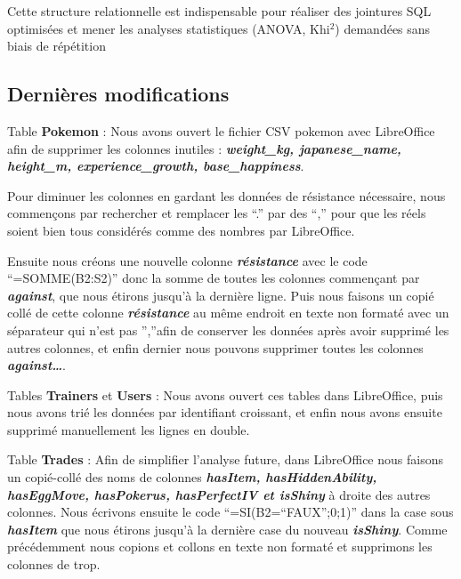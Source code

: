 \documentclass[mstat,12pt]{unswthesis}
\begin{document}
Cette structure relationnelle est indispensable pour réaliser des
jointures SQL optimisées et mener les analyses statistiques (ANOVA,
Khi\(^2\)) demandées sans biais de répétition

\bigskip

\subsection{Dernières modifications}\label{derniuxe8res-modifications}

Table \textbf{Pokemon} : Nous avons ouvert le fichier CSV pokemon avec
LibreOffice afin de supprimer les colonnes inutiles :
\textbf{\emph{weight\_kg, japanese\_name, height\_m, experience\_growth,
base\_happiness}}.

\bigskip

Pour diminuer les colonnes en gardant les données de résistance
nécessaire, nous commençons par rechercher et remplacer les ``.'' par
des ``,'' pour que les réels soient bien tous considérés comme des
nombres par LibreOffice.

\bigskip

Ensuite nous créons une nouvelle colonne \textbf{\emph{résistance}} avec
le code ``=SOMME(B2:S2)'' donc la somme de toutes les colonnes
commençant par \textbf{\emph{against}}, que nous étirons jusqu'à la
dernière ligne. Puis nous faisons un copié collé de cette colonne
\textbf{\emph{résistance}} au même endroit en texte non formaté avec un
séparateur qui n'est pas '',''afin de conserver les données après avoir
supprimé les autres colonnes, et enfin dernier nous pouvons supprimer
toutes les colonnes \textbf{\emph{against\ldots{}}}.

\bigskip

Tables \textbf{Trainers} et \textbf{Users} : Nous avons ouvert ces
tables dans LibreOffice, puis nous avons trié les données par
identifiant croissant, et enfin nous avons ensuite supprimé manuellement
les lignes en double.

\bigskip

Table \textbf{Trades} : Afin de simplifier l'analyse future, dans
LibreOffice nous faisons un copié-collé des noms de colonnes
\textbf{\emph{hasItem, hasHiddenAbility, hasEggMove, hasPokerus,
hasPerfectIV et isShiny}} à droite des autres colonnes. Nous écrivons
ensuite le code ``=SI(B2=``FAUX'';0;1)'' dans la case sous
\textbf{\emph{hasItem}} que nous étirons jusqu'à la dernière case du
nouveau \textbf{\emph{isShiny}}. Comme précédemment nous copions et
collons en texte non formaté et supprimons les colonnes de trop.
\end{document}
